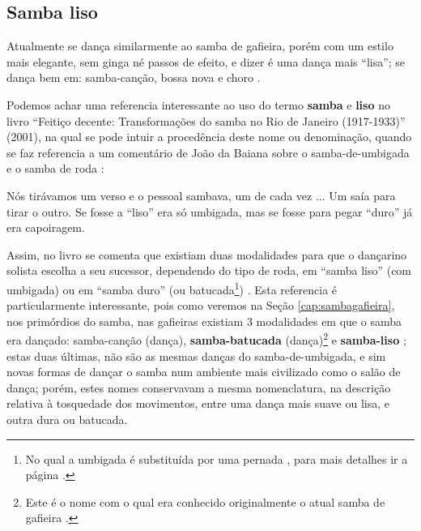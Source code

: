 \subsection{Samba liso} 
\label{subsec:sambalisodef}
Atualmente se dança similarmente ao samba de gafieira, 
porém com um estilo mais elegante, sem ginga né passos de efeito, e dizer é uma dança mais ``lisa'';
se dança bem em: samba-canção, bossa nova e choro \cite[pp. 134]{perna2002samba}.


Podemos achar uma referencia interessante ao uso do termo \textbf{samba} e \textbf{liso}  no livro 
``Feitiço decente: Transformações do samba no Rio de Janeiro (1917-1933)'' (2001),
na qual se pode intuir a procedência deste nome ou denominação, 
quando se faz referencia a um comentário de João da Baiana sobre o samba-de-umbigada e o samba de roda \cite[pp. 109]{sandroni2001feitico}: 
\begin{citando}
Nós tirávamos um verso e o pessoal sambava, um de cada vez ... 
Um saía para tirar o outro.
Se fosse a ``liso'' era só umbigada, mas se fosse para pegar ``duro'' já era capoiragem. 
\end{citando}
Assim, no livro se comenta que existiam duas modalidades para que o dançarino solista escolha a seu sucessor, 
dependendo do tipo de roda, em ``samba liso'' (com umbigada) ou em ``samba duro'' 
(ou batucada\footnote{No qual a umbigada é substituída por uma pernada \cite[pp. 109]{sandroni2001feitico},
para mais detalhes ir a página \pageref{ref:batuquedanca}.}) \cite[pp. 109]{sandroni2001feitico}.
Esta referencia 
é particularmente interessante, pois como veremos na Seção \ref{cap:sambagafieira},
nos primórdios do samba, nas gafieiras existiam 3 modalidades em que o samba era dançado: samba-canção (dança),
\textbf{samba-batucada} (dança)\footnote{Este 
é o nome com o qual era conhecido originalmente o atual samba de gafieira \cite[pp. 143]{perna2002samba}.} 
e \textbf{samba-liso} \cite[pp. 143]{perna2002samba};
estas duas últimas, não são as mesmas danças do samba-de-umbigada, 
e sim novas formas de dançar o samba num ambiente mais civilizado como o salão de dança;
porém, estes nomes conservavam a mesma nomenclatura, na descrição 
relativa à tosquedade dos movimentos, entre uma dança mais suave ou lisa, 
e outra dura ou batucada.



